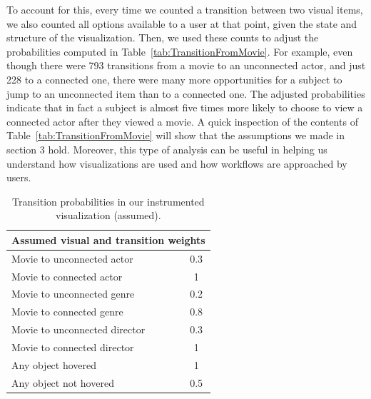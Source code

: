 To account for this, every time we counted a transition between two visual items, we also counted all options available to a user at that point, given the state and structure of the visualization. Then, we used these counts to adjust the probabilities computed in Table~\ref{tab:TransitionFromMovie}. For example, even though there were 793 transitions from a movie to an unconnected actor, and just 228 to a connected one, there were many more opportunities for a subject to jump to an unconnected item than to a connected one. The adjusted probabilities indicate that in fact a subject is almost five times more likely to choose to view a connected actor after they viewed a movie. A quick inspection of the contents of Table~\ref{tab:TransitionFromMovie} will show that the assumptions we made in section 3 hold. Moreover, this type of analysis can be useful in helping us understand how visualizations are used and how workflows are approached by users.



\begin{table}[htbp]
	\centering
		\begin{tabular}{|l|c|}
			\hline
			 \multicolumn{2}{|c|}{Assumed visual and transition weights} \\ \hline
			Movie to unconnected actor & 0.3\\\hline
			Movie to connected actor & 1\\\hline
			Movie to unconnected genre & 0.2\\\hline
			Movie to connected genre & 0.8\\\hline
			Movie to unconnected director & 0.3\\\hline
			Movie to connected director & 1\\\hline
			Any object hovered & 1\\\hline
			Any object not hovered & 0.5\\
			\hline			
		\end{tabular}
	\caption{Transition probabilities in our instrumented visualization (assumed).}
	\label{tab:Transition2}
\end{table}

